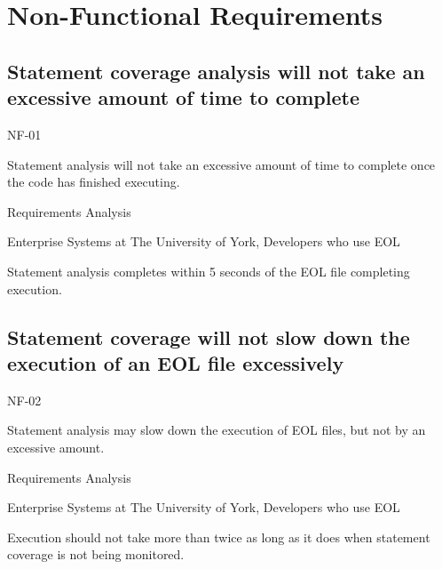 \section{Non-Functional Requirements}


\subsection{Statement coverage analysis will not take an excessive amount of time to complete}
\begin{description}[style=sameline,leftmargin=4.5cm,nolistsep]
\item[\hspace*{0.3cm}Label] NF-01
\item[\hspace*{0.3cm}Description] Statement analysis will not take an excessive amount of time to complete once the code has finished executing.
\item[\hspace*{0.3cm}Source] Requirements Analysis
\item[\hspace*{0.3cm}Stakeholders] Enterprise Systems at The University of York, Developers who use EOL
\item[\hspace*{0.3cm}Satisfiable Conditions] Statement analysis completes within 5 seconds of the EOL file completing execution.
\end{description}

\subsection{Statement coverage will not slow down the execution of an EOL file excessively}
\begin{description}[style=sameline,leftmargin=4.5cm,nolistsep]
\item[\hspace*{0.3cm}Label] NF-02
\item[\hspace*{0.3cm}Description] Statement analysis may slow down the execution of EOL files, but not by an excessive amount.
\item[\hspace*{0.3cm}Source] Requirements Analysis
\item[\hspace*{0.3cm}Stakeholders] Enterprise Systems at The University of York, Developers who use EOL
\item[\hspace*{0.3cm}Satisfiable Conditions] Execution should not take more than twice as long as it does when statement coverage is not being monitored.
\end{description}

